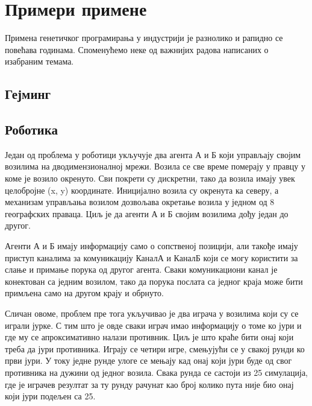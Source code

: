 \documentclass[a4paper]{article}
\begin{document}
\section{Примери примене}
Примена генетичког програмирања у индустрији је разнолико и рапидно се повећава годинама. Споменућемо неке од важнијих радова написаних о изабраним темама.
\subsection{Гејминг}
\subsection{Роботика}
Један од проблема у роботици укључује два агента А и Б који управљају својим возилима на дводимензионалној мрежи. Возила се све време померају у правцу у коме је возило окренуто. Сви покрети су дискретни, тако да возила имају увек целобројне (x, y) координате. Иницијално возила су окренута ка северу, а механизам управљања возилом дозвољава окретање возила у једном од 8 географских праваца. Циљ је да агенти А и Б својим возилима дођу један до другог.

Агенти А и Б имају информацију само о сопственој позицији, али такође имају приступ каналима за комуникацију КаналА и КаналБ који се могу користити за слање и примање порука од другог агента. Сваки комуникациони канал је конектован са једним возилом, тако да порука послата са једног краја може бити примљена само на другом крају и обрнуто. \cite{robo0}

Сличан овоме, проблем пре тога укључивао је два играча у возилима који су се играли јурке. С тим што је овде сваки играч имао информацију о томе ко јури и где му се апроксимативно налази противник. Циљ је што краће бити онај који треба да јури противника. Играју се четири игре, смењујући се у свакој рунди ко први јури. У току једне рунде улоге се мењају кад онај који јури буде од свог противника на дужини од једног возила. Свака рунда се састоји из 25 симулација, где је играчев резултат за ту рунду рачунат као број колико пута није био онај који јури подељен са 25. \cite{robo1}
\end{document}
